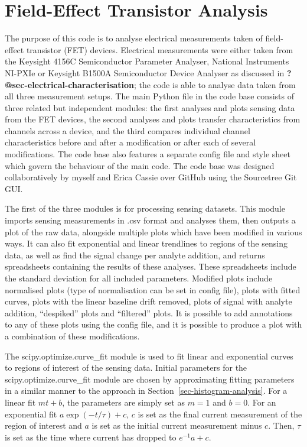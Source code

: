 \documentclass[
  a4paper,
]{scrbook}
\begin{document}
\hypertarget{sec-field-effect-transistor-analysis}{%
\section{Field-Effect Transistor
Analysis}\label{sec-field-effect-transistor-analysis}}

The purpose of this code is to analyse electrical measurements taken of
field-effect transistor (FET) devices. Electrical measurements were
either taken from the Keysight 4156C Semiconductor Parameter Analyser,
National Instruments NI-PXIe or Keysight B1500A Semiconductor Device
Analyser as discussed in \textbf{?@sec-electrical-characterisation}; the
code is able to analyse data taken from all three measurement setups.
The main Python file in the code base consists of three related but
independent modules: the first analyses and plots sensing data from the
FET devices, the second analyses and plots transfer characteristics from
channels across a device, and the third compares individual channel
characteristics before and after a modification or after each of several
modifications. The code base also features a separate config file and
style sheet which govern the behaviour of the main code. The code base
was designed collaboratively by myself and Erica Cassie over GitHub
using the Sourcetree Git GUI.

The first of the three modules is for processing sensing datasets. This
module imports sensing measurements in .csv format and analyses them,
then outputs a plot of the raw data, alongside multiple plots which have
been modified in various ways. It can also fit exponential and linear
trendlines to regions of the sensing data, as well as find the signal
change per analyte addition, and returns spreadsheets containing the
results of these analyses. These spreadsheets include the standard
deviation for all included parameters. Modified plots include normalised
plots (type of normalisation can be set in config file), plots with
fitted curves, plots with the linear baseline drift removed, plots of
signal with analyte addition, ``despiked'' plots and ``filtered'' plots.
It is possible to add annotations to any of these plots using the config
file, and it is possible to produce a plot with a combination of these
modifications.

The scipy.optimize.curve\_fit module is used to fit linear and
exponential curves to regions of interest of the sensing data. Initial
parameters for the scipy.optimize.curve\_fit module are chosen by
approximating fitting parameters in a similar manner to the approach in
Section~\ref{sec-histogram-analysis}. For a linear fit \(mt + b\), the
parameters are simply set as \(m=1\) and \(b=0\). For an exponential fit
\(a\exp{(-t/\tau)} + c\), \(c\) is set as the final current measurement
of the region of interest and \(a\) is set as the initial current
measurement minus \(c\). Then, \(\tau\) is set as the time where current
has dropped to \(e^{-1}a + c\).
\end{document}
